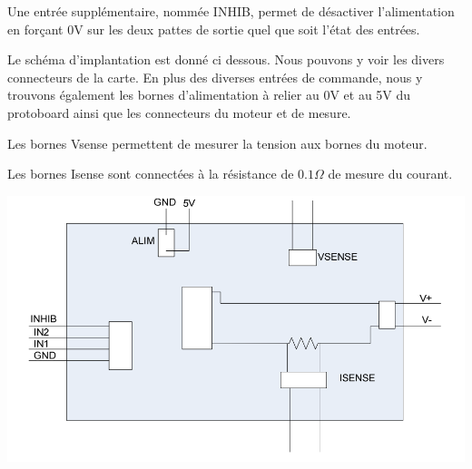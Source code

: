 \documentclass{../template/labo}
\begin{document}
Une entrée supplémentaire, nommée INHIB, permet de désactiver l'alimentation en forçant 0V sur les deux
pattes de sortie quel que soit l'état des entrées.


Le schéma d'implantation est donné ci dessous. Nous pouvons y voir les divers connecteurs de la carte. En plus
des diverses entrées de commande, nous y trouvons également les bornes d'alimentation à relier au 0V et au 5V
du protoboard ainsi que les connecteurs du moteur et de mesure.


Les bornes Vsense permettent de mesurer la tension aux bornes du moteur.


Les bornes Isense sont connectées à la résistance de $0.1\Omega$ de mesure du courant.

\begin{center}
\includegraphics[width=15cm]{sch11}
\end{center}
\end{document}
